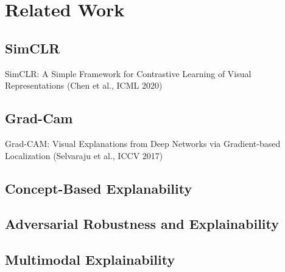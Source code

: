 \section{Related Work}
\label{sec:related_work}

\subsection{SimCLR}
SimCLR: A Simple Framework for Contrastive Learning of Visual Representations (Chen et al., ICML 2020)

\subsection{Grad-Cam}
Grad-CAM: Visual Explanations from Deep Networks via Gradient-based Localization (Selvaraju et al., ICCV 2017)

\subsection{Concept-Based Explanability}

\subsection{Adversarial Robustness and Explainability}

\subsection{Multimodal Explainability}